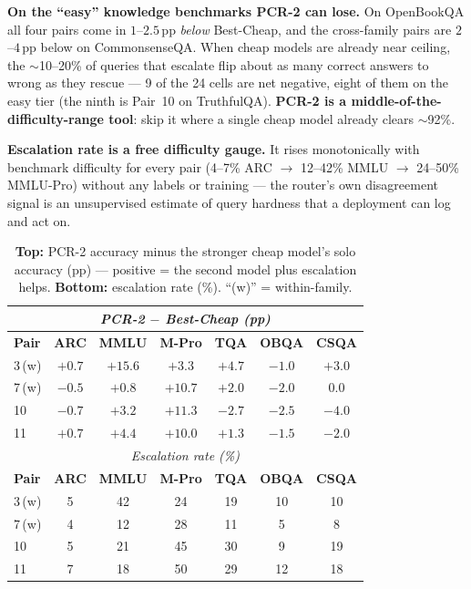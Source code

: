 \documentclass[conference]{IEEEtran}
\begin{document}
\textbf{On the ``easy'' knowledge benchmarks PCR-2 can lose.} On OpenBookQA all
four pairs come in $1$--$2.5$\,pp \textit{below} Best-Cheap, and the cross-family
pairs are $2$--$4$\,pp below on CommonsenseQA. When cheap models are already near
ceiling, the $\sim$10--20\% of queries that escalate flip about as many correct
answers to wrong as they rescue --- 9 of the 24 cells are net negative, eight of
them on the easy tier (the ninth is Pair~10 on TruthfulQA). \textbf{PCR-2 is a middle-of-the-difficulty-range tool}: skip it where
a single cheap model already clears $\sim$92\%.

\textbf{Escalation rate is a free difficulty gauge.} It rises monotonically with
benchmark difficulty for every pair (4--7\% ARC $\to$ 12--42\% MMLU $\to$
24--50\% MMLU-Pro) without any labels or training --- the router's own
disagreement signal is an unsupervised estimate of query hardness that a
deployment can log and act on.

\begin{table}[!t]
\caption{\textbf{Top:} PCR-2 accuracy minus the stronger cheap model's solo
accuracy (pp) --- positive = the second model plus escalation helps.
\textbf{Bottom:} escalation rate (\%). ``(w)'' = within-family.}
\label{tab:netgain}
\renewcommand{\arraystretch}{1.2}
\footnotesize
\setlength{\tabcolsep}{5pt}
\begin{tabular}{l c c c c c c}
\toprule
\multicolumn{7}{c}{\textit{PCR-2 $-$ Best-Cheap (pp)}} \\
\midrule
\textbf{Pair} & \textbf{ARC} & \textbf{MMLU} & \textbf{M-Pro} & \textbf{TQA} & \textbf{OBQA} & \textbf{CSQA} \\
\midrule
3\,{\footnotesize(w)} & $+0.7$ & $+15.6$ & $+3.3$ & $+4.7$ & $-1.0$ & $+3.0$ \\
7\,{\footnotesize(w)} & $-0.5$ & $+0.8$ & $+10.7$ & $+2.0$ & $-2.0$ & $0.0$ \\
10 & $-0.7$ & $+3.2$ & $+11.3$ & $-2.7$ & $-2.5$ & $-4.0$ \\
11 & $+0.7$ & $+4.4$ & $+10.0$ & $+1.3$ & $-1.5$ & $-2.0$ \\
\midrule
\multicolumn{7}{c}{\textit{Escalation rate (\%)}} \\
\midrule
\textbf{Pair} & \textbf{ARC} & \textbf{MMLU} & \textbf{M-Pro} & \textbf{TQA} & \textbf{OBQA} & \textbf{CSQA} \\
\midrule
3\,{\footnotesize(w)} & 5 & 42 & 24 & 19 & 10 & 10 \\
7\,{\footnotesize(w)} & 4 & 12 & 28 & 11 & 5 & 8 \\
10 & 5 & 21 & 45 & 30 & 9 & 19 \\
11 & 7 & 18 & 50 & 29 & 12 & 18 \\
\bottomrule
\end{tabular}
\end{table}
\end{document}
